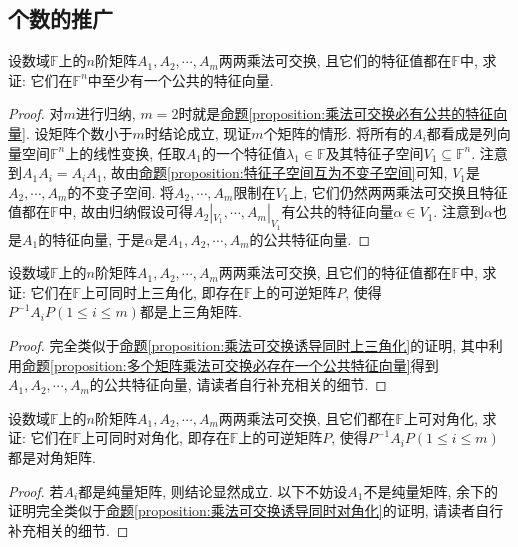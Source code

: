 \documentclass[../../main.tex]{subfiles}
\begin{document}
\subsection{个数的推广}

\begin{proposition}\label{proposition:多个矩阵乘法可交换必存在一个公共特征向量}
设数域\(\mathbb{F}\)上的\(n\)阶矩阵\(A_{1},A_{2},\cdots ,A_{m}\)两两乘法可交换, 且它们的特征值都在\(\mathbb{F}\)中, 求证: 它们在\(\mathbb{F}^n\)中至少有一个公共的特征向量.
\end{proposition}
\begin{proof}
对\(m\)进行归纳, \(m = 2\)时就是\hyperref[proposition:乘法可交换必有公共的特征向量]{命题\ref{proposition:乘法可交换必有公共的特征向量}}. 设矩阵个数小于\(m\)时结论成立, 现证\(m\)个矩阵的情形. 将所有的\(A_{i}\)都看成是列向量空间\(\mathbb{F}^n\)上的线性变换, 任取\(A_{1}\)的一个特征值\(\lambda_{1} \in \mathbb{F}\)及其特征子空间\(V_{1}\subseteq \mathbb{F}^n\). 注意到\(A_{1}A_{i}=A_{i}A_{1}\), 故由\hyperref[proposition:特征子空间互为不变子空间]{命题\ref{proposition:特征子空间互为不变子空间}}可知, \(V_{1}\)是\(A_{2},\cdots ,A_{m}\)的不变子空间. 将\(A_{2},\cdots ,A_{m}\)限制在\(V_{1}\)上, 它们仍然两两乘法可交换且特征值都在\(\mathbb{F}\)中, 故由归纳假设可得\(A_{2}|_{V_{1}},\cdots ,A_{m}|_{V_{1}}\)有公共的特征向量\(\alpha \in V_{1}\). 注意到\(\alpha\)也是\(A_{1}\)的特征向量, 于是\(\alpha\)是\(A_{1},A_{2},\cdots ,A_{m}\)的公共特征向量.
\end{proof}

\begin{proposition}\label{proposition:多个矩阵乘法可交换诱导同时上三角化}
设数域\(\mathbb{F}\)上的\(n\)阶矩阵\(A_{1},A_{2},\cdots ,A_{m}\)两两乘法可交换, 且它们的特征值都在\(\mathbb{F}\)中, 求证: 它们在\(\mathbb{F}\)上可同时上三角化, 即存在\(\mathbb{F}\)上的可逆矩阵\(P\), 使得\(P^{-1}A_{i}P(1\leqslant  i\leqslant  m)\)都是上三角矩阵.
\end{proposition}
\begin{proof}
完全类似于\hyperref[proposition:乘法可交换诱导同时上三角化]{命题\ref{proposition:乘法可交换诱导同时上三角化}}的证明, 其中利用\hyperref[proposition:多个矩阵乘法可交换必存在一个公共特征向量]{命题\ref{proposition:多个矩阵乘法可交换必存在一个公共特征向量}}得到\(A_{1},A_{2},\cdots ,A_{m}\)的公共特征向量, 请读者自行补充相关的细节.
\end{proof}

\begin{proposition}\label{proposition:多个矩阵乘法可交换诱导同时对角化}
设数域\(\mathbb{F}\)上的\(n\)阶矩阵\(A_{1},A_{2},\cdots ,A_{m}\)两两乘法可交换, 且它们都在\(\mathbb{F}\)上可对角化, 求证: 它们在\(\mathbb{F}\)上可同时对角化, 即存在\(\mathbb{F}\)上的可逆矩阵\(P\), 使得\(P^{-1}A_{i}P(1\leqslant  i\leqslant  m)\)都是对角矩阵.
\end{proposition}
\begin{proof}
若\(A_{i}\)都是纯量矩阵, 则结论显然成立. 以下不妨设\(A_{1}\)不是纯量矩阵, 余下的证明完全类似于\hyperref[proposition:乘法可交换诱导同时对角化]{命题\ref{proposition:乘法可交换诱导同时对角化}}的证明, 请读者自行补充相关的细节.
\end{proof}
\end{document}
